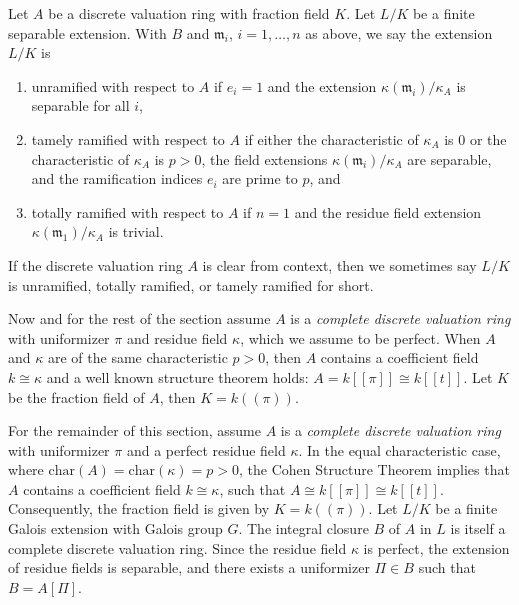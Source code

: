 \begin{definition}[\stackstag{09E9}]\label{definition:tamely_ramified_dvrs}
Let $A$ be a discrete valuation ring with fraction field $K$. Let $L/K$ be a finite separable extension. With $B$ and $\mathfrak m_ i$, $i = 1, \ldots , n$ 
as above, we say the extension $L/K$ is
\begin{enumerate}
    \item unramified with respect to $A$ if $e_ i = 1$ and the extension $\kappa (\mathfrak m_ i)/\kappa _ A$ is separable for all $i$,
    \item tamely ramified with respect to $A$ if either the characteristic of $\kappa _ A$ is $0$ or the characteristic of $\kappa _ A$ is $p > 0$, the field extensions $\kappa (\mathfrak m_ i)/\kappa _ A$ are separable, and the ramification indices $e_ i$ are prime to $p$, and
    \item totally ramified with respect to $A$ if $n = 1$ and the residue field extension $\kappa (\mathfrak m_1)/\kappa _ A$ is trivial.
\end{enumerate}
If the discrete valuation ring $A$ is clear from context, then we sometimes say $L/K$ is unramified, totally ramified, or tamely ramified for short.
\end{definition}

Now and for the rest of the section assume $A$ is a \textit{complete discrete valuation ring} with uniformizer $\pi$ 
and residue field $\kappa$, which we assume to be perfect. When $A$ and $\kappa$ are of the same characteristic $p > 0$, 
then $A$ contains a coefficient field $k \cong \kappa$ and a well known structure theorem holds: $A = k[[\pi ]] \cong k[[t]]$.
Let $K$ be the fraction field of $A$, then $K=k((\pi))$.

For the remainder of this section, assume $A$ is a \textit{complete discrete valuation ring} with uniformizer $\pi$ and a perfect residue 
field $\kappa$. In the equal characteristic case, where $\text{char}(A) = \text{char}(\kappa) = p > 0$, the 
Cohen Structure Theorem implies that $A$ contains a coefficient field $k \cong \kappa$, such that $A \cong k[[\pi]] \cong k[[t]]$. 
Consequently, the fraction field is given by $K = k((\pi))$.
Let $L/K$ be a finite Galois extension with Galois group $G$. 
The integral closure $B$ of $A$ in $L$ is itself a complete discrete valuation ring. 
Since the residue field $\kappa$ is perfect, the extension of residue fields is separable, and there exists a uniformizer 
$\Pi \in B$ such that $B = A[\Pi]$.

